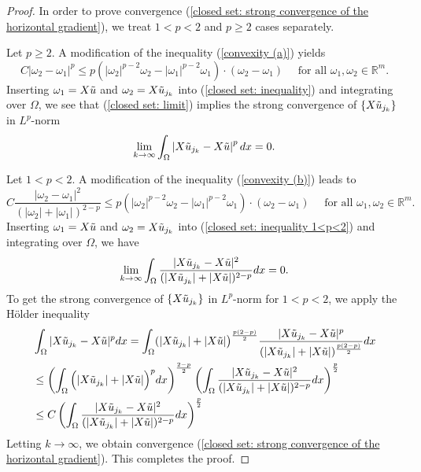 \documentclass[a4paper,12pt,reqno]{amsart}
\renewcommand\eqref[1]{(\ref{#1})} %
\numberwithin{equation}{section}
\theoremstyle{plain}
\theoremstyle{definition}
\begin{document}
\begin{proof}
In order to prove convergence \eqref{closed set: strong convergence of the horizontal gradient}, we treat $1<p<2$ and $p\geq2$ cases separately.



Let $p\geq 2$. A modification  of the inequality \eqref{convexity (a)} yields
\begin{equation}\label{closed set: inequality}
C\left|\omega_{2}-\omega_{1}\right|^{p} \leq p\left(\left|\omega_{2}\right|^{p-2} \omega_{2}-\left|\omega_{1}\right|^{p-2} \omega_{1}\right) \cdot\left(\omega_{2}-\omega_{1}\right) \quad \text{ for all }\omega_{1}, \omega_{2} \in \mathbb{R}^{m}.
\end{equation}
Inserting $\omega_{1}=X \Tilde{u}$ and $\omega_{2}=X \Tilde{u}_{j_{k}}$ into \eqref{closed set: inequality} and integrating over $\Omega$, we see that \eqref{closed set: limit} implies the strong convergence of $\{X \Tilde{u}_{j_{k}}\}$ in $L^{p}$-norm 
$$
\lim _{k \rightarrow \infty} \int_{\Omega}\left|X \Tilde{u}_{j_{k}}-X \Tilde{u}\right|^{p} d x=0 .
$$



Let $1<p<2$.
A modification  of the inequality \eqref{convexity (b)} leads to
\begin{equation}\label{closed set: inequality 1<p<2}
C\frac{|\omega_{2}-\omega_{1}|^{2}}{(|\omega_{2}|+|\omega_{1}|)^{2-p}}   \leq p\left(\left|\omega_{2}\right|^{p-2} \omega_{2}-\left|\omega_{1}\right|^{p-2} \omega_{1}\right)\cdot\left(\omega_{2}-\omega_{1}\right) \quad \text{ for all }\omega_{1}, \omega_{2} \in \mathbb{R}^{m}.
\end{equation}
Inserting $\omega_{1}=X \Tilde{u}$ and $\omega_{2}=X \Tilde{u}_{j_{k}}$ into \eqref{closed set: inequality 1<p<2} and integrating over $\Omega$, we have
\begin{equation*}
\lim_{k\to\infty}\int_{\Omega}\frac{|X \Tilde{u}_{j_{k}}-X \Tilde{u}|^{2}}{(|X \Tilde{u}_{j_{k}}|+|X \Tilde{u}|)^{2-p}}dx=0.
\end{equation*}
To get the strong convergence of $\{X \Tilde{u}_{j_{k}}\}$ in $L^{p}$-norm for $1<p<2$, we apply the H\"older inequality 
\begin{equation}\label{1<p<2 convergence}
\begin{aligned}
&\int_{\Omega}|X \Tilde{u}_{j_{k}}-X \Tilde{u}|^{p}dx=\int_{\Omega}(|X \Tilde{u}_{j_{k}}|+|X \Tilde{u}|\big)^{\frac{p(2-p)}{2}}\frac{|X \Tilde{u}_{j_{k}}-X \Tilde{u}|^{p}}{(|X \Tilde{u}_{j_{k}}|+|X \Tilde{u}|)^{\frac{p(2-p)}{2}}}dx
\\
&\leq\left(\int_{\Omega}\Big(|X \Tilde{u}_{j_{k}}|+|X \Tilde{u}|\Big)^{p}dx \right)^{\frac{2-p}{2}}\left(\int_{\Omega}\frac{|X \Tilde{u}_{j_{k}}-X \Tilde{u}|^{2}}{(|X \Tilde{u}_{j_{k}}|+|X \Tilde{u}|)^{2-p}}dx \right)^{\frac{p}{2}}
\\
&\leq C\left(\int_{\Omega}\frac{|X \Tilde{u}_{j_{k}}-X \Tilde{u}|^{2}}{(|X \Tilde{u}_{j_{k}}|+|X \Tilde{u}|)^{2-p}}dx \right)^{\frac{p}{2}}
\end{aligned}
\end{equation}
Letting $k\to\infty$, we obtain convergence \eqref{closed set: strong convergence of the horizontal gradient}. This completes the proof.
\end{proof}
\end{document}
